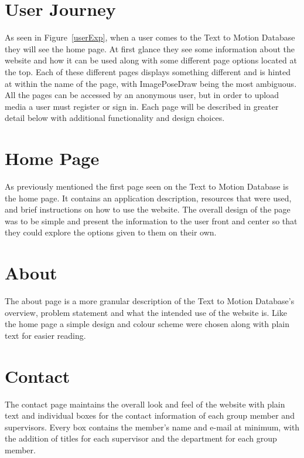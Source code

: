 \documentclass{scrreprt}
\begin{document}
\section{User Journey}

As seen in Figure~\ref{userExp}, when a user comes to the Text to Motion
Database they will see the home page. At first glance they see some information
about the website and how it can be used along with some different page options
located at the top. Each of these different pages displays something different
and is hinted at within the name of the page, with ImagePoseDraw being the most
ambiguous. All the pages can be accessed by an anonymous user, but in order to
upload media a user must register or sign in. Each page will be described in
greater detail below with additional functionality and design choices.

\section{Home Page}

As previously mentioned the first page seen on the Text to Motion Database is
the home page. It contains an application description, resources that were
used, and brief instructions on how to use the website. The overall design of
the page was to be simple and present the information to the user front and
center so that they could explore the options given to them on their own.

\section{About}

The about page is a more granular description of the Text to Motion Database’s
overview, problem statement and what the intended use of the website is. Like
the home page a simple design and colour scheme were chosen along with plain
text for easier reading.

\section{Contact}

The contact page maintains the overall look and feel of the website with plain
text and individual boxes for the contact information of each group member and
supervisors. Every box contains the member's name and e-mail at minimum, with
the addition of titles for each supervisor and the department for each group
member.
\end{document}
